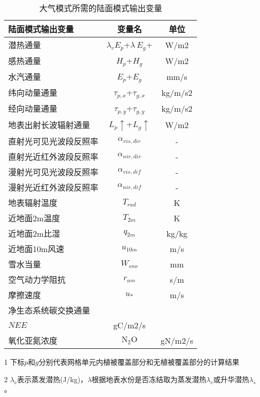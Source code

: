 \begin{table}[]
\centering
\caption{大气模式所需的陆面模式输出变量}
\label{tab:大气模式所需的陆面模式输出变量}
\begin{threeparttable}
\begin{tabular}{lcc}
\toprule
陆面模式输出变量    & 变量名                            & 单位      \\ \midrule
潜热通量        & $\lambda_vE_p$+$\lambda\ E_g$+ & W/m2    \\
感热通量        & $H_p$+$H_g$                    & W/m2    \\
水汽通量        & $E_p$+$E_g$                    & mm/s    \\
纬向动量通量      & $\tau_{p,x}$+$\tau_{g,x}$      & kg/m/s2 \\
经向动量通量      & $\tau_{p,y}$+$\tau_{g,y}$      & kg/m/s2 \\
地表出射长波辐射通量  & $L_p\uparrow$+$L_g\uparrow$    & W/m2    \\
直射光可见光波段反照率 & $\alpha_{vis,dir}$             & -       \\
直射光近红外波段反照率 & $\alpha_{nir,dir}$             & -       \\
漫射光可见光波段反照率 & $\alpha_{vis,dif}$             & -       \\
漫射光近红外波段反照率 & $\alpha_{nir,dif}$             & -       \\
地表辐射温度      & $T_{rad}$                      & K       \\
近地面2m温度     & $T_{2m}$                       & K       \\
近地面2m比湿     & $q_{2m}$                       & kg/kg   \\
近地面10m风速    & $u_{10m}$                      & m/s     \\
雪水当量        & $W_{sno}$                      & mm      \\
空气动力学阻抗     & $r_{am}$                       & s/m     \\
摩擦速度        & $u_\ast$                       & m/s     \\
净生态系统碳交换通量  &                                &         \\
$NEE$       & gC/m2/s                        &         \\
氧化亚氮浓度      & $\mathrm{N_2O}$                         & gN/m2/s\\\bottomrule
         
\end{tabular}
\begin{tablenotes}
\footnotesize
\item[1] 下标$p$和$g$分别代表网格单元内植被覆盖部分和无植被覆盖部分的计算结果
\item[2] $\lambda_v$表示蒸发潜热(J/kg)，$\lambda$根据地表水份是否冻结取为蒸发潜热$\lambda_v$或升华潜热$\lambda_s$。
\end{tablenotes}
\end{threeparttable}
\end{table}

